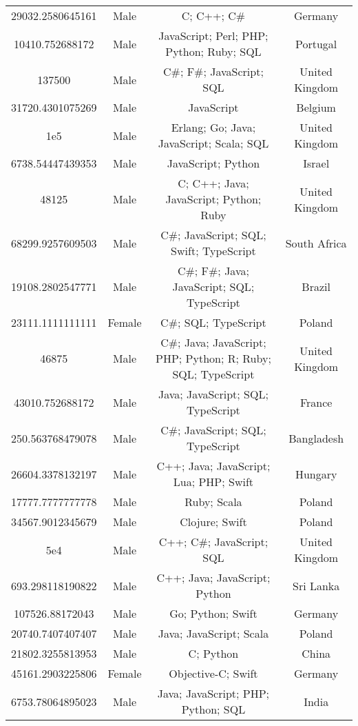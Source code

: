 \begin{center}
\begin{tabular}{ |c|c|c|c| }
29032.2580645161  &  Male  &  C; C++; C\#  &  Germany  \\ 
10410.752688172  &  Male  &  JavaScript; Perl; PHP; Python; Ruby; SQL  &  Portugal  \\ 
137500  &  Male  &  C\#; F\#; JavaScript; SQL  &  United Kingdom  \\ 
31720.4301075269  &  Male  &  JavaScript  &  Belgium  \\ 
1e5  &  Male  &  Erlang; Go; Java; JavaScript; Scala; SQL  &  United Kingdom  \\ 
6738.54447439353  &  Male  &  JavaScript; Python  &  Israel  \\ 
48125  &  Male  &  C; C++; Java; JavaScript; Python; Ruby  &  United Kingdom  \\ 
68299.9257609503  &  Male  &  C\#; JavaScript; SQL; Swift; TypeScript  &  South Africa  \\ 
19108.2802547771  &  Male  &  C\#; F\#; Java; JavaScript; SQL; TypeScript  &  Brazil  \\ 
23111.1111111111  &  Female  &  C\#; SQL; TypeScript  &  Poland  \\ 
46875  &  Male  &  C\#; Java; JavaScript; PHP; Python; R; Ruby; SQL; TypeScript  &  United Kingdom  \\ 
43010.752688172  &  Male  &  Java; JavaScript; SQL; TypeScript  &  France  \\ 
250.563768479078  &  Male  &  C\#; JavaScript; SQL; TypeScript  &  Bangladesh  \\ 
26604.3378132197  &  Male  &  C++; Java; JavaScript; Lua; PHP; Swift  &  Hungary  \\ 
17777.7777777778  &  Male  &  Ruby; Scala  &  Poland  \\ 
34567.9012345679  &  Male  &  Clojure; Swift  &  Poland  \\ 
5e4  &  Male  &  C++; C\#; JavaScript; SQL  &  United Kingdom  \\ 
693.298118190822  &  Male  &  C++; Java; JavaScript; Python  &  Sri Lanka  \\ 
107526.88172043  &  Male  &  Go; Python; Swift  &  Germany  \\ 
20740.7407407407  &  Male  &  Java; JavaScript; Scala  &  Poland  \\ 
21802.3255813953  &  Male  &  C; Python  &  China  \\ 
45161.2903225806  &  Female  &  Objective-C; Swift  &  Germany  \\ 
6753.78064895023  &  Male  &  Java; JavaScript; PHP; Python; SQL  &  India  \\ 

\end{tabular}
\end{center}
